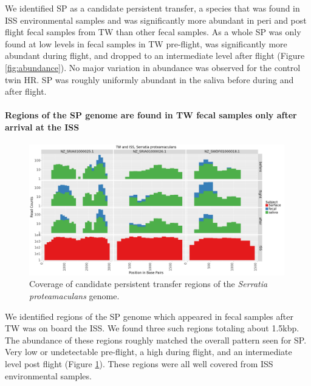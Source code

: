 We identified SP as a candidate persistent transfer, a species that was found in ISS environmental samples and was significantly more abundant in peri and post flight fecal samples from TW than other fecal samples. As a whole SP was only found at low levels in fecal samples in TW pre-flight, was significantly more abundant during flight, and dropped to an intermediate level after flight (Figure \ref{fig:abundance}). No major variation in abundance was observed for the control twin HR. SP was roughly uniformly abundant in the saliva before during and after flight.

\paragraph{Regions of the SP genome are found in TW fecal samples only after arrival at the ISS}

\begin{figure}
  \begin{center}
    \includegraphics[width=0.99\textwidth]{figs/sprota_read_recruit.png}
	\caption{\small{
	    Coverage of candidate persistent transfer regions of the \textit{Serratia proteamaculans} genome.
	}}
    \label{fig:sprota}
  \end{center}
\end{figure}

We identified regions of the SP genome which appeared in fecal samples after TW was on board the ISS. We found three such regions totaling about 1.5kbp. The abundance of these regions roughly matched the overall pattern seen for SP. Very low or undetectable pre-flight, a high during flight, and an intermediate level post flight (Figure \ref{fig:sprota}). These regions were all well covered from ISS environmental samples.

